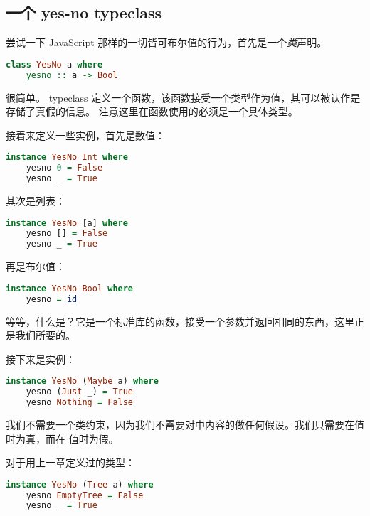 \documentclass[./main.tex]{subfiles}
\begin{document}
\subsection*{一个 yes-no typeclass}

尝试一下 JavaScript 那样的一切皆可布尔值的行为，首先是一个\textit{类}声明。

\begin{lstlisting}[language=Haskell]
  class YesNo a where
    yesno :: a -> Bool
\end{lstlisting}

很简单。 typeclass 定义一个函数，该函数接受一个类型作为值，其可以被认作是存储了真假的信息。
注意这里在函数使用的必须是一个具体类型。

接着来定义一些实例，首先是数值：

\begin{lstlisting}[language=Haskell]
  instance YesNo Int where
    yesno 0 = False
    yesno _ = True
\end{lstlisting}

其次是列表：

\begin{lstlisting}[language=Haskell]
  instance YesNo [a] where
    yesno [] = False
    yesno _ = True
\end{lstlisting}

再是布尔值：

\begin{lstlisting}[language=Haskell]
  instance YesNo Bool where
    yesno = id
\end{lstlisting}

等等，什么是？它是一个标准库的函数，接受一个参数并返回相同的东西，这里正是我们所要的。

接下来是实例：

\begin{lstlisting}[language=Haskell]
  instance YesNo (Maybe a) where
    yesno (Just _) = True
    yesno Nothing = False
\end{lstlisting}

我们不需要一个类约束，因为我们不需要对中内容的做任何假设。我们只需要在值时为真，而在
值时为假。

对于用上一章定义过的类型：

\begin{lstlisting}[language=Haskell]
  instance YesNo (Tree a) where
    yesno EmptyTree = False
    yesno _ = True
\end{lstlisting}
\end{document}
